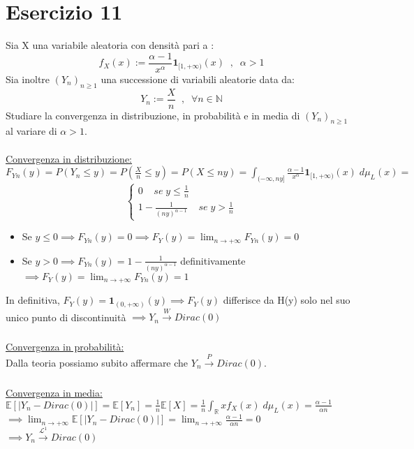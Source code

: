 \documentclass{article}
\begin{document}
\section*{Esercizio 11}
Sia X una variabile aleatoria con densità pari a :
\[ f_{X}(x) := \frac{\alpha - 1}{x^{\alpha}} \mathbf{1}_{[1,+\infty)}(x) \; \; , \; \; \alpha > 1 \]
Sia inoltre $(Y_{n})_{n \geq 1}$ una successione di variabili aleatorie data da:
\[ Y_{n} := \frac{X}{n} \; \; , \; \; \forall n \in \mathbb{N} \]
Studiare la convergenza in distribuzione, in probabilità e in media di $(Y_{n})_{n \geq 1}$ al variare di $\alpha > 1$.\\
\\
\underline{Convergenza in distribuzione:}\\
$F_{Yn}(y) = P(Y_{n} \leq y) = P(\frac{X}{n} \leq y) = P(X \leq ny) = \int_{(-\infty, ny]}^{}\frac{\alpha - 1}{x^{\alpha}} \mathbf{1}_{[1,+\infty)}(x) \; d\mu_{L}(x) =$\\
\[
\begin{cases}
0 \; \; \; \; se \; y \leq \frac{1}{n}\\
1 - \frac{1}{(ny)^{\alpha - 1}} \; \; \; \; se \; y>\frac{1}{n}
\end{cases}
\]
\begin{itemize}
\item Se $y \leq 0 \implies F_{Yn}(y) = 0 \implies F_{Y}(y) = \lim_{n\to +\infty}{F_{Yn}(y)} = 0$
\item Se $y>0 \implies F_{Yn}(y) = 1-\frac{1}{(ny)^{\alpha - 1}}$ definitivamente $\implies F_{Y}(y) = \lim_{n\to +\infty}F_{Yn}(y) = 1$
\end{itemize}
In definitiva, $F_{Y}(y) = \mathbf{1}_{(0,+\infty)}(y) \implies F_{Y}(y)$ differisce da H(y) solo nel suo unico punto di discontinuità $\implies Y_{n} \xrightarrow[]{W} Dirac(0)$\\
\\
\underline{Convergenza in probabilità:}\\
Dalla teoria possiamo subito affermare che $Y_{n} \xrightarrow[]{P} Dirac(0)$.\\
\\
\underline{Convergenza in media:}\\
$\mathbb{E}[|Y_{n}-Dirac(0)|] = \mathbb{E}[Y_{n}] = \frac{1}{n} \mathbb{E}[X] = \frac{1}{n} \int_{\mathbb{R}}^{}x f_{X}(x) \; d\mu_{L}(x) = \frac{\alpha - 1}{\alpha n}$\\
$\implies \lim_{n\to +\infty}\mathbb{E}[|Y_{n}-Dirac(0)|] = \lim_{n\to +\infty}\frac{\alpha - 1}{\alpha n} = 0$\\
$\implies Y_{n} \xrightarrow[]{\mathcal{L}^{1}} Dirac(0)$
\end{document}
